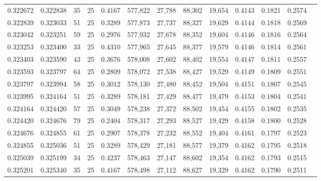 \begin{tabular}{rrrrrrrrrrrrr}
0.322672 & 0.322838 &    35 &  25 &                                     0.4167 & 577,822 &  27,788 &  88,302 &  19,654 & 0.4143 & 0.1821 & 0.2574 \\
0.322839 & 0.323033 &    51 &  25 &                                     0.3289 & 577,873 &  27,737 &  88,327 &  19,629 & 0.4144 & 0.1818 & 0.2569 \\
0.323042 & 0.323251 &    59 &  25 &                                     0.2976 & 577,932 &  27,678 &  88,352 &  19,604 & 0.4146 & 0.1816 & 0.2564 \\
0.323253 & 0.323400 &    33 &  25 &                                     0.4310 & 577,965 &  27,645 &  88,377 &  19,579 & 0.4146 & 0.1814 & 0.2561 \\
0.323403 & 0.323590 &    43 &  25 &                                     0.3676 & 578,008 &  27,602 &  88,402 &  19,554 & 0.4147 & 0.1811 & 0.2557 \\
0.323593 & 0.323797 &    64 &  25 &                                     0.2809 & 578,072 &  27,538 &  88,427 &  19,529 & 0.4149 & 0.1809 & 0.2551 \\
0.323797 & 0.323994 &    58 &  25 &                                     0.3012 & 578,130 &  27,480 &  88,452 &  19,504 & 0.4151 & 0.1807 & 0.2545 \\
0.323995 & 0.324164 &    51 &  25 &                                     0.3289 & 578,181 &  27,429 &  88,477 &  19,479 & 0.4153 & 0.1804 & 0.2541 \\
0.324164 & 0.324420 &    57 &  25 &                                     0.3049 & 578,238 &  27,372 &  88,502 &  19,454 & 0.4155 & 0.1802 & 0.2535 \\
0.324420 & 0.324676 &    79 &  25 &                                     0.2404 & 578,317 &  27,293 &  88,527 &  19,429 & 0.4158 & 0.1800 & 0.2528 \\
0.324676 & 0.324855 &    61 &  25 &                                     0.2907 & 578,378 &  27,232 &  88,552 &  19,404 & 0.4161 & 0.1797 & 0.2523 \\
0.324855 & 0.325036 &    51 &  25 &                                     0.3289 & 578,429 &  27,181 &  88,577 &  19,379 & 0.4162 & 0.1795 & 0.2518 \\
0.325039 & 0.325199 &    34 &  25 &                                     0.4237 & 578,463 &  27,147 &  88,602 &  19,354 & 0.4162 & 0.1793 & 0.2515 \\
0.325201 & 0.325340 &    35 &  25 &                                     0.4167 & 578,498 &  27,112 &  88,627 &  19,329 & 0.4162 & 0.1790 & 0.2511 \\

\end{tabular}
